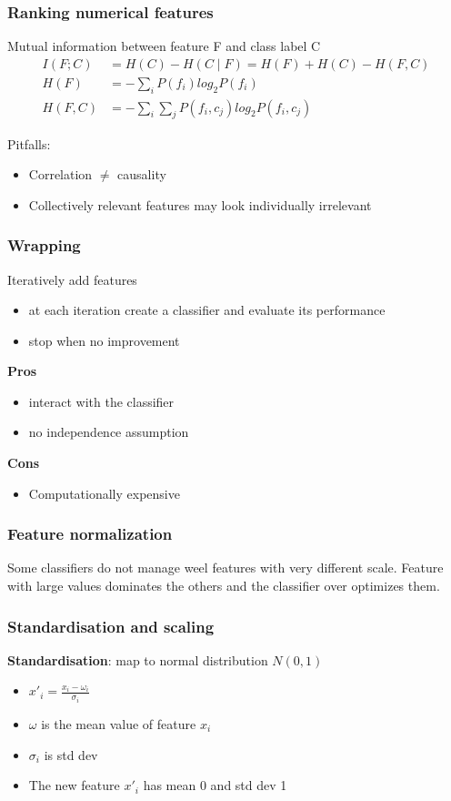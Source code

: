 \subsubsection{Ranking numerical features}
Mutual information between feature F and class label C
\begin{align*}
  I(F; C) & =  H(C) - H(C \mid F) = H(F) + H(C) - H(F, C) \\
  H(F) & = - \sum_i P(f_i)log_2 P(f_i) \\
  H(F, C) & = - \sum_i \sum_j P(f_i, c_j) log_2 P(f_i, c_j)
\end{align*}

Pitfalls:
\begin{itemize}
\item Correlation $ \neq $ causality
\item Collectively relevant features may look individually irrelevant
\end{itemize}

\subsubsection{Wrapping}
Iteratively add features
\begin{itemize}
\item at each iteration create a classifier and evaluate its
  performance
\item stop when no improvement
\end{itemize}
\textbf{Pros}
\begin{itemize}
\item interact with the classifier
\item no independence assumption
\end{itemize}

\textbf{Cons}
\begin{itemize}
\item Computationally expensive
\end{itemize}


\subsubsection{Feature normalization}
Some classifiers do not manage weel features with very different
scale. Feature with large values dominates the others and the
classifier over optimizes them.

\subsubsection{Standardisation and scaling}
\textbf{Standardisation}: map to normal distribution $ N(0, 1) $
\begin{itemize}
\item $ x'_i = \frac{x_i - \omega_i}{\sigma_i} $
\item $ \omega $ is the mean value of feature $ x_i $
\item $ \sigma_i $ is std dev
\item The new feature $ x'_i $ has mean 0 and std dev 1
\end{itemize}

